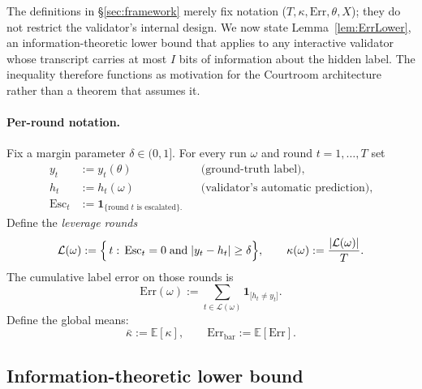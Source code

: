 \documentclass[11pt]{article}
\newcommand{\Err}{\mathrm{Err}}
\newcommand{\E}{\mathbb{E}}
\begin{document}
The definitions in \S\ref{sec:framework} merely fix notation
(\(T,\kappa,\Err,\theta,X\)); they do not restrict the validator's
internal design.  We now state Lemma~\ref{lem:ErrLower}, an
information-theoretic lower bound that applies to any interactive
validator whose transcript carries at most \(I\) bits of information
about the hidden label.  The inequality therefore functions as
motivation for the Courtroom architecture rather than a theorem
that assumes it.

\paragraph{Per-round notation.}
Fix a margin parameter $\delta\in(0,1]$.
For every run $\omega$ and round $t=1,\dots,T$ set
\begin{align*}
  y_t      &:=y_t(\theta)          &&\text{(ground-truth label)},\\
  h_t      &:=h_t(\omega)          &&\text{(validator’s automatic prediction)},\\
  \mathrm{Esc}_t&:=\mathbf 1_{\{\text{round $t$ is escalated}\}.}
\end{align*}
Define the \emph{leverage rounds}
\begin{equation}\label{eq:kappaDef}
  \mathcal L(\omega):=\Bigl\{\,t:\,
     \mathrm{Esc}_t=0\;\text{and}\;|y_t-h_t|\ge\delta\Bigr\},
  \qquad
  \kappa(\omega):=\frac{|\mathcal L(\omega)|}{T}.
\end{equation}
The cumulative label error on those rounds is
\begin{equation}\label{eq:ErrDef}
  \Err(\omega):=\sum_{t\in\mathcal L(\omega)}
                \mathbf 1_{\!\bigl[h_t\neq y_t\bigr]}.
\end{equation}
Define the global means:
\[
  \bar\kappa:=\E[\kappa],
  \qquad
  \Err_{\mathrm{bar}}:=\E[\Err].
\]


\subsection{Information-theoretic lower bound}\label{sec:info-bound}
\end{document}
